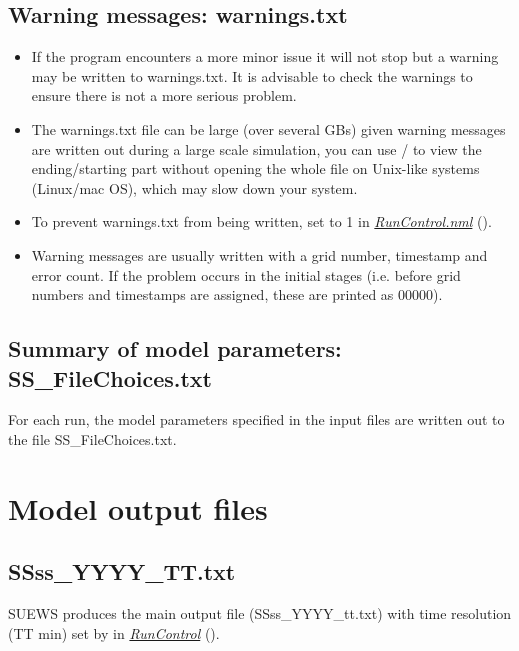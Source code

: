 \documentclass[letterpaper,10pt,english]{sphinxmanual}
\begin{document}
\subsection{Warning messages: warnings.txt}
\label{\detokenize{output_files/output_files:warning-messages-warnings-txt}}\begin{itemize}
\item {} 
If the program encounters a more minor issue it will not stop but a
warning may be written to warnings.txt. It is advisable to check the
warnings to ensure there is not a more serious problem.

\item {} 
The warnings.txt file can be large (over several GBs) given warning
messages are written out during a large scale simulation, you can use
/ to view the ending/starting part without opening
the whole file on Unix-like systems (Linux/mac OS), which may slow
down your system.

\item {} 
To prevent warnings.txt from being written, set 
to 1 in {\hyperref[\detokenize{output_files/output_files:RunControl.nml}]{\emph{RunControl.nml}}} ().

\item {} 
Warning messages are usually written with a grid number, timestamp
and error count. If the problem occurs in the initial stages (i.e.
before grid numbers and timestamps are assigned, these are printed as
00000).

\end{itemize}


\subsection{Summary of model parameters: SS\_FileChoices.txt}
\label{\detokenize{output_files/output_files:summary-of-model-parameters-ss-filechoices-txt}}
For each run, the model parameters specified in the input files are
written out to the file SS\_FileChoices.txt.


\section{Model output files}
\label{\detokenize{output_files/output_files:model-output-files}}

\subsection{SSss\_YYYY\_TT.txt}
\label{\detokenize{output_files/output_files:ssss-yyyy-tt-txt}}
SUEWS produces the main output file (SSss\_YYYY\_tt.txt) with time
resolution (TT min) set by  in
{\hyperref[\detokenize{output_files/output_files:RunControl}]{\emph{RunControl}}} ().
\end{document}
